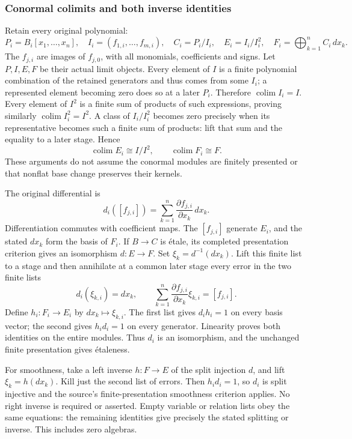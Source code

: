 \subsubsection{Conormal colimits and both inverse identities}\label{algebra-proof-073-conormal-colimits-and-both-inverse-identities}

Retain every original polynomial: \[
P_i=B_i[x_1,\ldots,x_n],\quad I_i=(f_{1,i},\ldots,f_{m,i}),\quad
C_i=P_i/I_i,\quad E_i=I_i/I_i^2,\quad F_i=\bigoplus_{k=1}^n C_i\,dx_k.
\] The \(f_{j,i}\) are images of \(f_{j,0}\), with all monomials, coefficients and signs. Let \(P,I,E,F\) be their actual limit objects. Every element of \(I\) is a finite polynomial combination of the retained generators and thus comes from some \(I_i\); a represented element becoming zero does so at a later \(P_i\). Therefore \(\operatorname{colim}I_i=I\). Every element of \(I^2\) is a finite sum of products of such expressions, proving similarly \(\operatorname{colim}I_i^2=I^2\). A class of \(I_i/I_i^2\) becomes zero precisely when its representative becomes such a finite sum of products: lift that sum and the equality to a later stage. Hence \[
\operatorname{colim}E_i\cong I/I^2,\qquad \operatorname{colim}F_i\cong F.
\] These arguments do not assume the conormal modules are finitely presented or that nonflat base change preserves their kernels.

The original differential is \[
d_i([f_{j,i}])=\sum_{k=1}^n\frac{\partial f_{j,i}}{\partial x_k}\,dx_k.
\] Differentiation commutes with coefficient maps. The \([f_{j,i}]\) generate \(E_i\), and the stated \(dx_k\) form the basis of \(F_i\). If \(B\to C\) is étale, its completed presentation criterion gives an isomorphism \(d:E\to F\). Set \(\xi_k=d^{-1}(dx_k)\). Lift this finite list to a stage and then annihilate at a common later stage every error in the two finite lists \[
d_i(\xi_{k,i})=dx_k,\qquad
\sum_{k=1}^n\frac{\partial f_{j,i}}{\partial x_k}\xi_{k,i}=[f_{j,i}].
\] Define \(h_i:F_i\to E_i\) by \(dx_k\mapsto\xi_{k,i}\). The first list gives \(d_i h_i=1\) on every basis vector; the second gives \(h_i d_i=1\) on every generator. Linearity proves both identities on the entire modules. Thus \(d_i\) is an isomorphism, and the unchanged finite presentation gives étaleness.

For smoothness, take a left inverse \(h:F\to E\) of the split injection \(d\), and lift \(\xi_k=h(dx_k)\). Kill just the second list of errors. Then \(h_i d_i=1\), so \(d_i\) is split injective and the source's finite-presentation smoothness criterion applies. No right inverse is required or asserted. Empty variable or relation lists obey the same equations: the remaining identities give precisely the stated splitting or inverse. This includes zero algebras.

